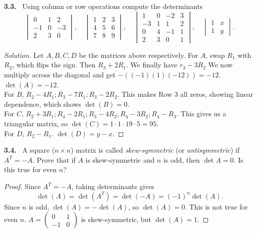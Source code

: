 \documentclass[12pt]{amsart}
\newcommand{\pmat}[1]{\begin{pmatrix}#1\end{pmatrix}}
\theoremstyle{plain}
\theoremstyle{definition}
\theoremstyle{remark}
\newenvironment{problem}[1]{\par\medskip\noindent\textbf{#1.}\ }{\par\smallskip}
\newenvironment{solution}{\begin{proof}[Solution]}{\end{proof}}
\begin{document}
\begin{problem}{3.3}
Using column or row operations compute the determinants
\[
  \begin{vmatrix} 0 & 1 & 2 \\ -1 & 0 & -3 \\ 2 & 3 & 0 \end{vmatrix}, \quad
  \begin{vmatrix} 1 & 2 & 3 \\ 4 & 5 & 6 \\ 7 & 8 & 9 \end{vmatrix}, \quad
  \begin{vmatrix} 1 & 0 & -2 & 3 \\ -3 & 1 & 1 & 2 \\ 0 & 4 & -1 & 1 \\ 2 & 3 & 0 & 1 \end{vmatrix}, \quad
  \begin{vmatrix} 1 & x \\ 1 & y \end{vmatrix}.
\]
\end{problem}

\begin{solution}
    Let $A,B,C,D$ be the matrices above respectively. For $A$, swap $R_1$ with $R_2$, which flips the sign. Then $R_3+ 2R_1$. We finally have $r_3 - 3R_2$ We now multiply across the diagonal and get $-((-1)(1)(-12))= -12$. $\det(A) = -12$. \\
    For $B$, $R_2-4R_1; R_3 - 7R_1; R_3 - 2R_2.$ This makes Row 3 all zeros, showing linear dependence, which shows $\det(B)=0.$\\
    For $C$, $R_2 + 3R_1; R_4 - 2R_1; R_3-4R_2;  R_4 - 3R_2; R_4 - R_3$. This gives us a triangular matrix, so $\det(C) = 1 \cdot 1\cdot19\cdot 5 = 95$. \\
    For $D$, $R_2 - R_1$. $\det (D)=y-x$.
\end{solution}
\begin{problem}{3.4}
A square ($n\times n$) matrix is called \emph{skew-symmetric} (or \emph{antisymmetric}) if $A^T = -A$. Prove that if $A$ is skew-symmetric and $n$ is odd, then $\det A = 0$. Is this true for even $n$?
\end{problem}

\begin{proof}
 
Since $A^T=-A$, taking determinants gives
\[
  \det(A)=\det(A^T)=\det(-A)=(-1)^n\det(A).
\]
Since $n$ is odd, $\det(A)=-\det(A)$, so $\det(A)=0$.
This is not true for even $n$.
$A=\pmat{0&1\\-1&0}$
is skew-symmetric, but $\det(A)=1$.
\end{proof}
\end{document}
